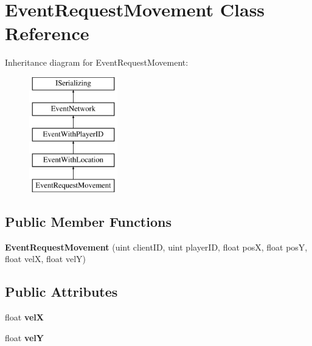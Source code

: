 \hypertarget{class_event_request_movement}{\section{Event\-Request\-Movement Class Reference}
\label{class_event_request_movement}
}
Inheritance diagram for Event\-Request\-Movement\-:\begin{figure}[H]
\begin{center}
\leavevmode
\includegraphics[height=5.000000cm]{class_event_request_movement}
\end{center}
\end{figure}
\subsection*{Public Member Functions}
\begin{DoxyCompactItemize}
\item 
\hypertarget{class_event_request_movement_ac23cc3d2b652f582980b751ec41aeb91}{{\bfseries Event\-Request\-Movement} (uint client\-I\-D, uint player\-I\-D, float pos\-X, float pos\-Y, float vel\-X, float vel\-Y)}\label{class_event_request_movement_ac23cc3d2b652f582980b751ec41aeb91}

\end{DoxyCompactItemize}
\subsection*{Public Attributes}
\begin{DoxyCompactItemize}
\item 
\hypertarget{class_event_request_movement_a655bb7665057cd5528bb0a033c3b7909}{float {\bfseries vel\-X}}\label{class_event_request_movement_a655bb7665057cd5528bb0a033c3b7909}

\item 
\hypertarget{class_event_request_movement_a0df71cf8c3c67d2b41461df286c75c6d}{float {\bfseries vel\-Y}}\label{class_event_request_movement_a0df71cf8c3c67d2b41461df286c75c6d}

\end{DoxyCompactItemize}
